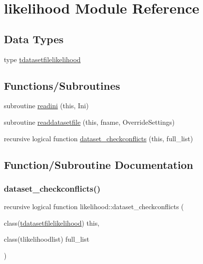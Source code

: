 \hypertarget{namespacelikelihood}{}\section{likelihood Module Reference}
\label{namespacelikelihood}
\subsection*{Data Types}
\begin{DoxyCompactItemize}
\item 
type \mbox{\hyperlink{structlikelihood_1_1tdatasetfilelikelihood}{tdatasetfilelikelihood}}
\end{DoxyCompactItemize}
\subsection*{Functions/\+Subroutines}
\begin{DoxyCompactItemize}
\item 
subroutine \mbox{\hyperlink{namespacelikelihood_a0d0df908a010f1e6ba689f48acdf156f}{readini}} (this, Ini)
\item 
subroutine \mbox{\hyperlink{namespacelikelihood_a9c3cb6205269d789cb3bbe6ad6a87eab}{readdatasetfile}} (this, fname, Override\+Settings)
\item 
recursive logical function \mbox{\hyperlink{namespacelikelihood_afafdd942174520c5e110fe88a86a248e}{dataset\+\_\+checkconflicts}} (this, full\+\_\+list)
\end{DoxyCompactItemize}


\subsection{Function/\+Subroutine Documentation}
\mbox{\label{namespacelikelihood_afafdd942174520c5e110fe88a86a248e}} 
\subsubsection{\texorpdfstring{dataset\+\_\+checkconflicts()}{dataset\_checkconflicts()}}
{\footnotesize\ttfamily recursive logical function likelihood\+::dataset\+\_\+checkconflicts (\begin{DoxyParamCaption}\item[{class(\mbox{\hyperlink{structlikelihood_1_1tdatasetfilelikelihood}{tdatasetfilelikelihood}})}]{this,  }\item[{class(tlikelihoodlist)}]{full\+\_\+list }\end{DoxyParamCaption})\hspace{0.3cm}{\ttfamily [private]}}

